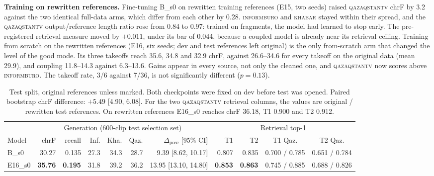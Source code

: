 \documentclass[11pt,twocolumn,a4paper]{article}
\newcommand{\cpl}{\Delta_{\text{pose}}}
\newcommand{\src}[1]{\textsc{#1}}
\newcommand{\ib}{\src{informburo}}
\newcommand{\kh}{\src{khabar}}
\newcommand{\qz}{\src{qazaqstantv}}
\renewcommand{\paragraph}[1]{\par\smallskip\noindent\textbf{#1}\hspace{0.5em}}
\begin{document}
\paragraph{Training on rewritten references.}
Fine-tuning B\_s0 on rewritten training references (E15, two seeds) raised \qz{} chrF by 3.2 against the two identical full-data arms, which differ from each other by 0.28. \ib{} and \kh{} stayed within their spread, and the \qz{} output/reference length ratio rose from 0.84 to 0.97: trained on fragments, the model had learned to stop early. The pre-registered retrieval measure moved by $+0.011$, under its bar of 0.044, because a coupled model is already near its retrieval ceiling. Training from scratch on the rewritten references (E16, six seeds; dev and test references left original) is the only from-scratch arm that changed the level of the good mode. Its three takeoffs reach 35.6, 34.8 and 32.9 chrF, against 26.6--34.6 for every takeoff on the original data (mean 29.9), and coupling 11.8--14.3 against 6.3--13.6. Gains appear in every source, not only the cleaned one, and \qz{} now scores above \ib. The takeoff rate, 3/6 against 7/36, is not significantly different ($p=0.13$).

\begin{table}[t]
\centering\small
\setlength{\tabcolsep}{3.6pt}
\begin{tabular}{lrrrrrrrrcc}
\toprule
& \multicolumn{6}{c}{Generation (600-clip test selection set)} & \multicolumn{4}{c}{Retrieval top-1} \\
\cmidrule(lr){2-7}\cmidrule(lr){8-11}
Model & chrF & recall & Inf. & Kha. & Qaz. & $\cpl$ [95\% CI] & T1 & T2 & T1 Qaz. & T2 Qaz. \\
\midrule
B\_s0 & 30.27 & 0.135 & 27.3 & 34.3 & 28.7 & 9.39 [8.62, 10.17] & 0.807 & 0.835 & 0.700 / 0.785 & 0.651 / 0.784 \\
E16\_s0 & \textbf{35.76} & \textbf{0.195} & 31.8 & 39.2 & 36.2 & 13.95 [13.10, 14.80] & \textbf{0.853} & \textbf{0.863} & 0.745 / 0.885 & 0.688 / 0.826 \\
\bottomrule
\end{tabular}
\caption{Test split, original references unless marked. Both checkpoints were fixed on dev before test was opened. Paired bootstrap chrF difference: $+5.49$ [4.90, 6.08]. For the two \qz{} retrieval columns, the values are original / rewritten test references. On rewritten references E16\_s0 reaches chrF 36.18, T1 0.900 and T2 0.912.}
\label{tab:test}
\end{table}
\end{document}
